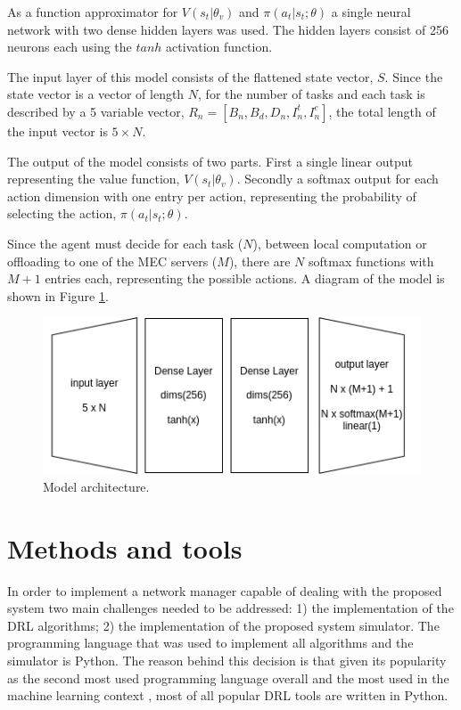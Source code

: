 As a function approximator for $V(s_t | \theta_v)$ and $\pi(a_t | s_t; \theta)$ a single neural network with two dense hidden layers was used. The hidden layers consist of 256 neurons each using the $tanh$ activation function. 

The input layer of this model consists of the flattened state vector, $S$. Since the state vector is a vector of length $N$, for the number of tasks and each task is described by a 5 variable vector, $R_n = [B_n, B_d, D_n, I_n^t, I_n^e]$, the total length of the input vector is $5 \times N$. 

The output of the model consists of two parts. First a single linear output representing the value function, $V(s_t | \theta_v)$. Secondly a softmax output for each action dimension with one entry per action, representing the probability of selecting the action, $\pi(a_t | s_t; \theta)$. 

Since the agent must decide for each task ($N$), between local computation or offloading to one of the MEC servers ($M$), there are $N$ softmax functions with $M+1$ entries each, representing the possible actions. A diagram of the model is shown in Figure \ref{fig:model}.

\begin{figure}[H]
  \centering
  \includegraphics[scale=0.8]{images/model_arch.png}
  \caption{Model architecture.}
  \label{fig:model}
\end{figure}

\section{Methods and tools}

\noindent In order to implement a network manager capable of dealing with the proposed system two main challenges needed to be addressed: 1) the implementation of the \acrshort{DRL} algorithms; 2) the implementation of the proposed system simulator. The programming language that was used to implement all algorithms and the simulator is Python. The reason behind this decision is that given its popularity as the second most used programming language overall \cite{pythonpop} and the most used in the machine learning context \cite{pythonmachine}, most of all popular \acrshort{DRL} tools are written in Python.


